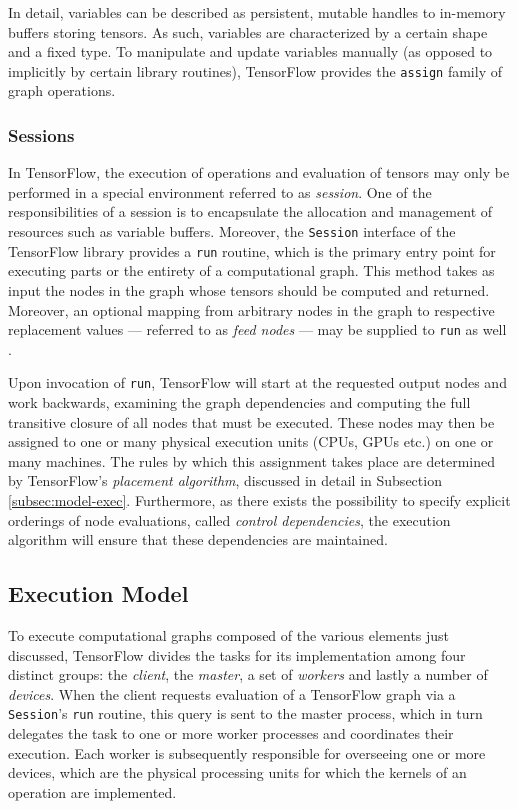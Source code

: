 In detail, variables can be described as persistent, mutable handles to
in-memory buffers storing tensors. As such, variables are characterized by a
certain shape and a fixed type. To manipulate and update variables manually (as
opposed to implicitly by certain library routines), TensorFlow provides the
\texttt{assign} family of graph operations.

\subsubsection{Sessions}\label{sec:model-graphs-sessions}

In TensorFlow, the execution of operations and evaluation of tensors may only be
performed in a special environment referred to as \emph{session}. One of the
responsibilities of a session is to encapsulate the allocation and management of
resources such as variable buffers. Moreover, the \texttt{Session} interface of
the TensorFlow library provides a \texttt{run} routine, which is the primary
entry point for executing parts or the entirety of a computational graph. This
method takes as input the nodes in the graph whose tensors should be computed
and returned. Moreover, an optional mapping from arbitrary nodes in the graph to
respective replacement values --- referred to as \emph{feed nodes} --- may be
supplied to \texttt{run} as well \cite{tensorflow}.

Upon invocation of \texttt{run}, TensorFlow will start at the requested output
nodes and work backwards, examining the graph dependencies and computing the
full transitive closure of all nodes that must be executed. These nodes may then
be assigned to one or many physical execution units (CPUs, GPUs etc.) on one or
many machines. The rules by which this assignment takes place are determined by
TensorFlow's \emph{placement algorithm}, discussed in detail in Subsection
\ref{subsec:model-exec}. Furthermore, as there exists the possibility to specify
explicit orderings of node evaluations, called \emph{control dependencies}, the
execution algorithm will ensure that these dependencies are maintained.

\subsection{Execution Model}\label{sec:model-exec}

To execute computational graphs composed of the various elements just discussed,
TensorFlow divides the tasks for its implementation among four distinct groups:
the \emph{client}, the \emph{master}, a set of \emph{workers} and lastly a
number of \emph{devices}. When the client requests evaluation of a TensorFlow
graph via a \texttt{Session}'s \texttt{run} routine, this query is sent to the
master process, which in turn delegates the task to one or more worker processes
and coordinates their execution. Each worker is subsequently responsible for
overseeing one or more devices, which are the physical processing units for
which the kernels of an operation are implemented.

